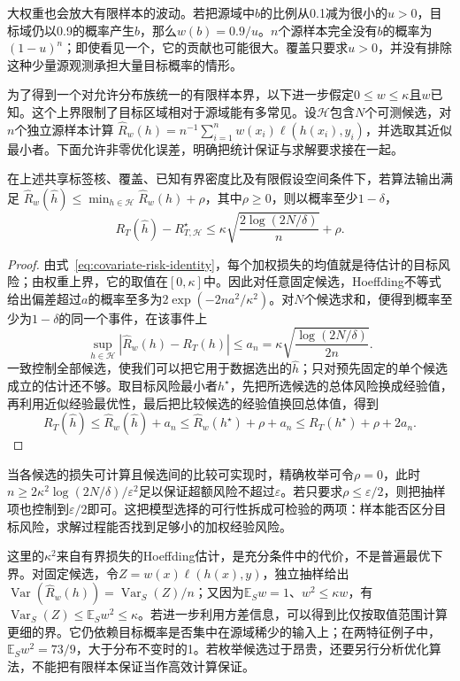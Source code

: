 大权重也会放大有限样本的波动。若把源域中$b$的比例从0.1减为很小的$u>0$，目标域仍以0.9的概率产生$b$，那么$w(b)=0.9/u$。$n$个源样本完全没有$b$的概率为$(1-u)^n$；即使看见一个，它的贡献也可能很大。覆盖只要求$u>0$，并没有排除这种少量源观测承担大量目标概率的情形。

为了得到一个对允许分布族统一的有限样本界，以下进一步假定$0\leq w\leq\kappa$且$w$已知。这个上界限制了目标区域相对于源域能有多常见。设$\mathcal H$包含$N$个可测候选，对$n$个独立源样本计算
$\widehat R_w(h)=n^{-1}\sum_{i=1}^n w(x_i)\ell(h(x_i),y_i)$，并选取其近似最小者。下面允许非零优化误差，明确把统计保证与求解要求接在一起。

\begin{theorem}[已知密度比下的迁移样本量界]
\label{thm:covariate-finite-pac}
在上述共享标签核、覆盖、已知有界密度比及有限假设空间条件下，若算法输出满足
$\widehat R_w(\widehat h)\leq\min_{h\in\mathcal H}\widehat R_w(h)+\rho$，其中$\rho\geq0$，则以概率至少$1-\delta$，
\begin{equation}
 R_T(\widehat h)-R_{T,\mathcal H}^{\star}
 \leq\kappa\sqrt{\frac{2\log(2N/\delta)}{n}}+\rho.
 \label{eq:covariate-finite-excess}
\end{equation}
\end{theorem}
\begin{proof}
由式~\eqref{eq:covariate-risk-identity}，每个加权损失的均值就是待估计的目标风险；由权重上界，它的取值在$[0,\kappa]$中。因此对任意固定候选，Hoeffding不等式给出偏差超过$a$的概率至多为$2\exp(-2na^2/\kappa^2)$。对$N$个候选求和，便得到概率至少为$1-\delta$的同一个事件，在该事件上
\[
 \sup_{h\in\mathcal H}|\widehat R_w(h)-R_T(h)|
 \leq a_n=\kappa\sqrt{\frac{\log(2N/\delta)}{2n}}.
\]
一致控制全部候选，使我们可以把它用于数据选出的$\widehat h$；只对预先固定的单个候选成立的估计还不够。取目标风险最小者$h^\star$，先把所选候选的总体风险换成经验值，再利用近似经验最优性，最后把比较候选的经验值换回总体值，得到
\[
 R_T(\widehat h)\leq\widehat R_w(\widehat h)+a_n
 \leq\widehat R_w(h^\star)+\rho+a_n
 \leq R_T(h^\star)+\rho+2a_n.
\]
\end{proof}

当各候选的损失可计算且候选间的比较可实现时，精确枚举可令$\rho=0$，此时$n\geq2\kappa^2\log(2N/\delta)/\varepsilon^2$足以保证超额风险不超过$\varepsilon$。若只要求$\rho\leq\varepsilon/2$，则把抽样项也控制到$\varepsilon/2$即可。这把模型选择的可行性拆成可检验的两项：样本能否区分目标风险，求解过程能否找到足够小的加权经验风险。

这里的$\kappa^2$来自有界损失的Hoeffding估计，是充分条件中的代价，不是普遍最优下界。对固定候选，令$Z=w(x)\ell(h(x),y)$，独立抽样给出$\operatorname{Var}(\widehat R_w(h))=\operatorname{Var}_S(Z)/n$；又因为$\mathbb E_Sw=1$、$w^2\leq\kappa w$，有$\operatorname{Var}_S(Z)\leq\mathbb E_Sw^2\leq\kappa$。若进一步利用方差信息，可以得到比仅按取值范围计算更细的界。它仍依赖目标概率是否集中在源域稀少的输入上；在两特征例子中，$\mathbb E_Sw^2=73/9$，大于分布不变时的1。若枚举候选过于昂贵，还要另行分析优化算法，不能把有限样本保证当作高效计算保证。

